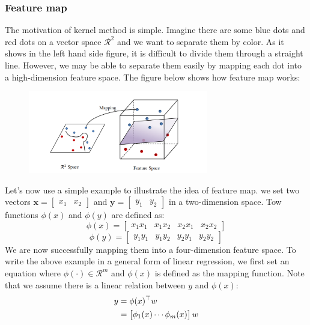 \subsubsection{Feature map}
The motivation of kernel method is simple. Imagine there are some blue dots and red dots on a vector space $\mathcal{R}^2$ and 
we want to separate them by color. As it shows in the left hand side figure, it is difficult to divide them through a straight 
line. However, we may be able to separate them easily by mapping each dot into a high-dimension feature space. The figure below 
shows how feature map works:
\begin{figure}[H]
    \centering
    \includegraphics[width=0.7\textwidth]{Mapping}
\end{figure}
Let's now use a simple example to illustrate the idea of feature map. 
we set two vectors $\textbf{x}=\begin{bmatrix}x_1&x_2\end{bmatrix}$ and $\textbf{y}=\begin{bmatrix}y_1&y_2\end{bmatrix}$ in a two-dimension space.
Tow functions $\phi(x)$ and $\phi(y)$ are defined as:
\begin{equation*}
    \phi(x)=\begin{bmatrix}
        x_1x_1&x_1x_2&x_2x_1&x_2x_2
    \end{bmatrix}
\end{equation*}
\begin{equation*}
    \phi(y)=\begin{bmatrix}
        y_1y_1&y_1y_2&y_2y_1&y_2y_2
    \end{bmatrix}
\end{equation*}
We are now successfully mapping them into a four-dimension feature space. 
To write the above example in a general form of linear regression, we first set an equation where $\phi(\cdot)\in\mathcal{R}^m$ and $\phi(x)$ is defined as the mapping function. Note that we assume there is a linear relation between $y$ and $\phi(x)$:
\begin{align}
    y&=\phi(x)^\top w \notag\\
     &= \begin{bmatrix}
        \phi_1(x)\cdots\phi_m(x)
        \end{bmatrix} w
\end{align}
